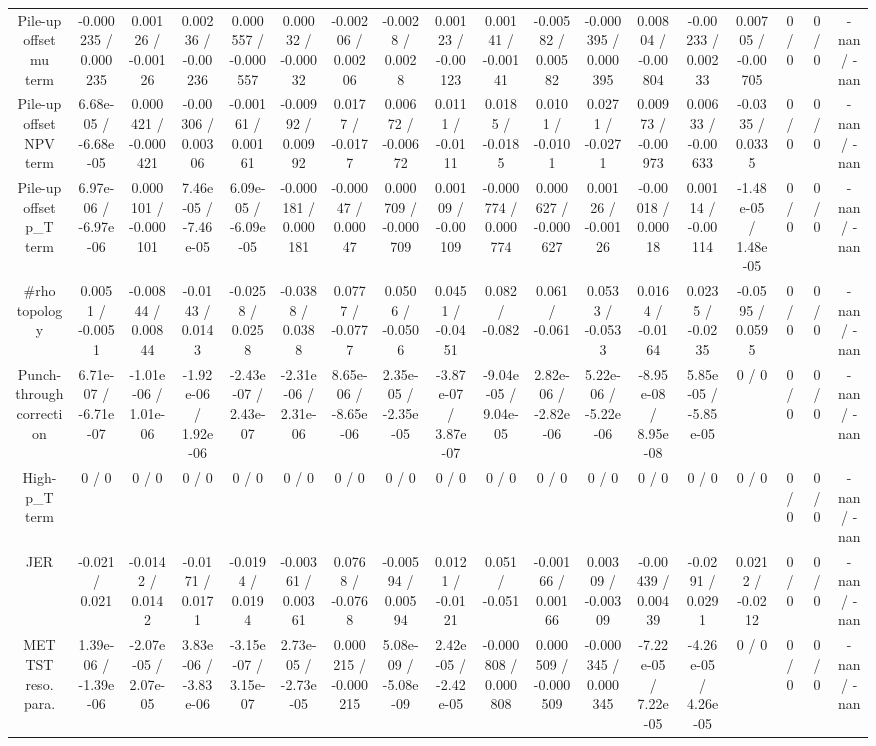 \documentclass[10pt]{article}
\begin{document}
\begin{table}[htbp]
\begin{center}
\begin{tabular}{|c|c|c|c|c|c|c|c|c|c|c|c|c|c|c|c|c|c|}
  Pile-up offset mu term & -0.000235 / 0.000235 & 0.00126 / -0.00126 & 0.00236 / -0.00236 & 0.000557 / -0.000557 & 0.00032 / -0.00032 & -0.00206 / 0.00206 & -0.0028 / 0.0028 & 0.00123 / -0.00123 & 0.00141 / -0.00141 & -0.00582 / 0.00582 & -0.000395 / 0.000395 & 0.00804 / -0.00804 & -0.00233 / 0.00233 & 0.00705 / -0.00705 & 0 / 0 & 0 / 0 & -nan / -nan \\ 
  Pile-up offset NPV term & 6.68e-05 / -6.68e-05 & 0.000421 / -0.000421 & -0.00306 / 0.00306 & -0.00161 / 0.00161 & -0.00992 / 0.00992 & 0.0177 / -0.0177 & 0.00672 / -0.00672 & 0.0111 / -0.0111 & 0.0185 / -0.0185 & 0.0101 / -0.0101 & 0.0271 / -0.0271 & 0.00973 / -0.00973 & 0.00633 / -0.00633 & -0.0335 / 0.0335 & 0 / 0 & 0 / 0 & -nan / -nan \\ 
  Pile-up offset p_{T} term & 6.97e-06 / -6.97e-06 & 0.000101 / -0.000101 & 7.46e-05 / -7.46e-05 & 6.09e-05 / -6.09e-05 & -0.000181 / 0.000181 & -0.00047 / 0.00047 & 0.000709 / -0.000709 & 0.00109 / -0.00109 & -0.000774 / 0.000774 & 0.000627 / -0.000627 & 0.00126 / -0.00126 & -0.00018 / 0.00018 & 0.00114 / -0.00114 & -1.48e-05 / 1.48e-05 & 0 / 0 & 0 / 0 & -nan / -nan \\ 
  #rho topology & 0.0051 / -0.0051 & -0.00844 / 0.00844 & -0.0143 / 0.0143 & -0.0258 / 0.0258 & -0.0388 / 0.0388 & 0.0777 / -0.0777 & 0.0506 / -0.0506 & 0.0451 / -0.0451 & 0.082 / -0.082 & 0.061 / -0.061 & 0.0533 / -0.0533 & 0.0164 / -0.0164 & 0.0235 / -0.0235 & -0.0595 / 0.0595 & 0 / 0 & 0 / 0 & -nan / -nan \\ 
  Punch-through correction & 6.71e-07 / -6.71e-07 & -1.01e-06 / 1.01e-06 & -1.92e-06 / 1.92e-06 & -2.43e-07 / 2.43e-07 & -2.31e-06 / 2.31e-06 & 8.65e-06 / -8.65e-06 & 2.35e-05 / -2.35e-05 & -3.87e-07 / 3.87e-07 & -9.04e-05 / 9.04e-05 & 2.82e-06 / -2.82e-06 & 5.22e-06 / -5.22e-06 & -8.95e-08 / 8.95e-08 & 5.85e-05 / -5.85e-05 & 0 / 0 & 0 / 0 & 0 / 0 & -nan / -nan \\ 
  High-p_{T} term & 0 / 0 & 0 / 0 & 0 / 0 & 0 / 0 & 0 / 0 & 0 / 0 & 0 / 0 & 0 / 0 & 0 / 0 & 0 / 0 & 0 / 0 & 0 / 0 & 0 / 0 & 0 / 0 & 0 / 0 & 0 / 0 & -nan / -nan \\ 
  JER & -0.021 / 0.021 & -0.0142 / 0.0142 & -0.0171 / 0.0171 & -0.0194 / 0.0194 & -0.00361 / 0.00361 & 0.0768 / -0.0768 & -0.00594 / 0.00594 & 0.0121 / -0.0121 & 0.051 / -0.051 & -0.00166 / 0.00166 & 0.00309 / -0.00309 & -0.00439 / 0.00439 & -0.0291 / 0.0291 & 0.0212 / -0.0212 & 0 / 0 & 0 / 0 & -nan / -nan \\ 
  MET TST reso. para. & 1.39e-06 / -1.39e-06 & -2.07e-05 / 2.07e-05 & 3.83e-06 / -3.83e-06 & -3.15e-07 / 3.15e-07 & 2.73e-05 / -2.73e-05 & 0.000215 / -0.000215 & 5.08e-09 / -5.08e-09 & 2.42e-05 / -2.42e-05 & -0.000808 / 0.000808 & 0.000509 / -0.000509 & -0.000345 / 0.000345 & -7.22e-05 / 7.22e-05 & -4.26e-05 / 4.26e-05 & 0 / 0 & 0 / 0 & 0 / 0 & -nan / -nan \\ 

\end{tabular}
\end{center}
\end{table}
\end{document}
